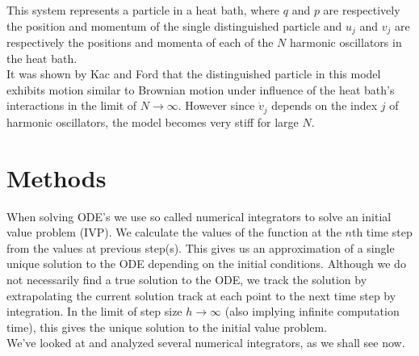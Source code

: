 \documentclass{article}
\begin{document}
This system represents a particle in a heat bath, where $q$ and $p$ are respectively the position and momentum of the single distinguished particle and $u_j$ and $v_j$ are respectively the positions and momenta of each of the $N$ harmonic oscillators in the heat bath. \\ 
It was shown by Kac and Ford \cite{fordkac} that the distinguished particle in this model exhibits motion similar to Brownian motion under influence of the heat bath's interactions in the limit of $N \rightarrow \infty$. However since $\dot v_j$ depends on the index $j$ of harmonic oscillators, the model becomes very stiff for large $N$.  

\section{Methods}\label{sec:methods}
When solving ODE's we use so called numerical integrators to solve an initial value problem (IVP). We calculate the values of the function at the $n$th time step from the values at previous step(s). This gives us an approximation of a single unique solution to the ODE depending on the initial conditions.  Although we do not necessarily find a true solution to the ODE, we track the solution by extrapolating the current solution track at each point to the next time step by integration. In the limit of step size $h\rightarrow \infty$ (also implying infinite computation time), this gives the unique solution to the initial value problem.\\ 

We've looked at and analyzed several numerical integrators, as we shall see now.
\end{document}
